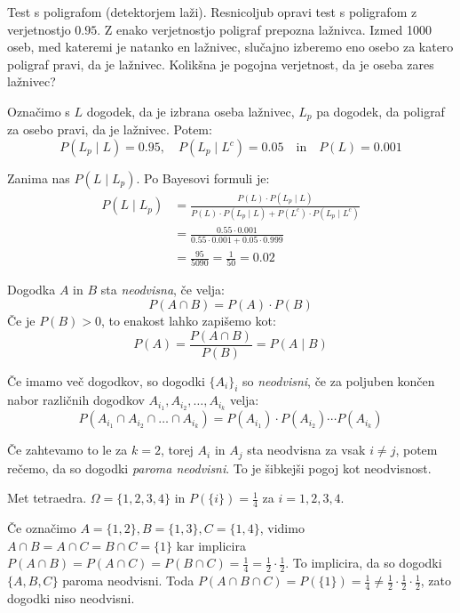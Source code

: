 \documentclass[12pt]{book}
\def\n{\noindent}
\theoremstyle{definition}
\theoremstyle{plain}
\theoremstyle{plain}
\theoremstyle{plain}
\theoremstyle{remark}
\begin{document}
\begin{zgled}
    Test s poligrafom (detektorjem laži). Resnicoljub opravi test s poligrafom z verjetnostjo $0.95$. Z enako verjetnostjo poligraf prepozna lažnivca. Izmed 1000 oseb, med kateremi je natanko en lažnivec, slučajno izberemo eno osebo za katero poligraf pravi, da je lažnivec. Kolikšna je pogojna verjetnost, da je oseba zares lažnivec?

    Označimo s $L$ dogodek, da je izbrana oseba lažnivec, $L_p$ pa dogodek, da poligraf za osebo pravi, da je lažnivec. Potem:
    $$
    P\left(L_p \mid L\right)=0.95, \quad  P\left(L_p \mid L^c\right)=0.05 \quad \text{in} \quad P(L)=0.001
    $$

    \n Zanima nas $P\left(L \mid L_p\right)$. Po Bayesovi formuli je:
    $$
    \begin{aligned}
        P\left(L \mid L_p\right)&=\frac{P(L) \cdot P\left(L_p \mid L\right)}{P(L) \cdot P\left(L_p \mid L\right)+P\left(L^c\right) \cdot P\left(L_p \mid L^c\right)} \\
        &=\frac{0.55 \cdot 0.001}{0.55 \cdot 0.001+0.05 \cdot 0.999} \\
        &=\frac{95}{5090} = \frac{1}{50} = 0.02 
    \end{aligned}
    $$
\end{zgled}

\n Dogodka $A$ in $B$ sta \emph{neodvisna}, če velja: 
$$
P(A \cap B)=P(A) \cdot P(B)
$$
Če je $P(B)>0$, to enakost lahko zapišemo kot: 
$$
P(A)=\frac{P\left(A \cap B\right)}{P(B)}=P(A \mid B)
$$

\n Če imamo več dogodkov, so dogodki $\{ A_i \}_i$ so \emph{neodvisni}, če za poljuben končen nabor različnih dogodkov $A_{i_1}, A_{i_2}, \ldots, A_{i_k}$ velja: 
$$
P\left(A_{i_1} \cap A_{i_2} \cap \ldots \cap A_{i_k}\right)=P\left(A_{i_1}\right) \cdot P\left(A_{i_2}\right) \cdots P\left(A_{i_k}\right)
$$

\n Če zahtevamo to le za $k=2$, torej $A_i$ in $A_j$ sta neodvisna za vsak $i \neq j$, potem rečemo, da so dogodki \emph{paroma neodvisni}. To je šibkejši pogoj kot neodvisnost. 

\begin{zgled}
    Met tetraedra. $\Omega=\{1,2,3,4\}$ in $P(\{i\})=\frac{1}{4}$ za $i = 1, 2, 3, 4$. 

    Če označimo $A=\{1,2\}, B=\{1,3\}, C=\{1,4\}$, vidimo $A \cap B=A \cap C=B \cap C=\{1\}$ kar implicira $P(A \cap B)=P(A \cap C)=P(B \cap C)=\frac{1}{4}=\frac{1}{2} \cdot \frac{1}{2}$. To implicira, da so dogodki $\{A, B, C\}$ paroma neodvisni. Toda $P(A \cap B \cap C)=P(\{1\})=\frac{1}{4} \neq \frac{1}{2} \cdot \frac{1}{2} \cdot \frac{1}{2}$, zato dogodki niso neodvisni. 
\end{zgled}
\end{document}
